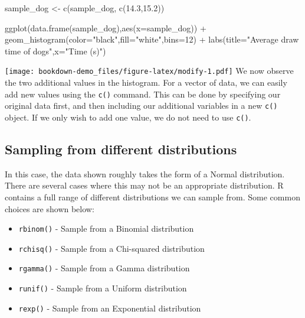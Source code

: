 \documentclass[
]{book}
\newenvironment{Shaded}{\begin{snugshade}}{\end{snugshade}}
\newcommand{\AttributeTok}[1]{\textcolor[rgb]{0.77,0.63,0.00}{#1}}
\newcommand{\DecValTok}[1]{\textcolor[rgb]{0.00,0.00,0.81}{#1}}
\newcommand{\FloatTok}[1]{\textcolor[rgb]{0.00,0.00,0.81}{#1}}
\newcommand{\FunctionTok}[1]{\textcolor[rgb]{0.00,0.00,0.00}{#1}}
\newcommand{\NormalTok}[1]{#1}
\newcommand{\OtherTok}[1]{\textcolor[rgb]{0.56,0.35,0.01}{#1}}
\newcommand{\SpecialCharTok}[1]{\textcolor[rgb]{0.00,0.00,0.00}{#1}}
\newcommand{\StringTok}[1]{\textcolor[rgb]{0.31,0.60,0.02}{#1}}
\providecommand{\tightlist}{%
  \setlength{\itemsep}{0pt}\setlength{\parskip}{0pt}}
\begin{document}
\begin{Shaded}
\begin{Highlighting}[]
\NormalTok{sample\_dog }\OtherTok{\textless{}{-}} \FunctionTok{c}\NormalTok{(sample\_dog, }\FunctionTok{c}\NormalTok{(}\FloatTok{14.3}\NormalTok{,}\FloatTok{15.2}\NormalTok{))}

\FunctionTok{ggplot}\NormalTok{(}\FunctionTok{data.frame}\NormalTok{(sample\_dog),}\FunctionTok{aes}\NormalTok{(}\AttributeTok{x=}\NormalTok{sample\_dog)) }\SpecialCharTok{+}
  \FunctionTok{geom\_histogram}\NormalTok{(}\AttributeTok{color=}\StringTok{"black"}\NormalTok{,}\AttributeTok{fill=}\StringTok{"white"}\NormalTok{,}\AttributeTok{bins=}\DecValTok{12}\NormalTok{) }\SpecialCharTok{+} 
            \FunctionTok{labs}\NormalTok{(}\AttributeTok{title=}\StringTok{"Average draw time of dogs"}\NormalTok{,}\AttributeTok{x=}\StringTok{"Time (s)"}\NormalTok{)}
\end{Highlighting}
\end{Shaded}

\texttt{[image: bookdown-demo\_files/figure-latex/modify-1.pdf]}
We now observe the two additional values in the histogram. For a vector of data, we can easily add new values using the \texttt{c()} command. This can be done by specifying our original data first, and then including our additional variables in a new \texttt{c()} object. If we only wish to add one value, we do not need to use \texttt{c()}.

\hypertarget{sampling-from-different-distributions}{%
\subsection{Sampling from different distributions}\label{sampling-from-different-distributions}}

In this case, the data shown roughly takes the form of a Normal distribution. There are several cases where this may not be an appropriate distribution. R contains a full range of different distributions we can sample from. Some common choices are shown below:

\begin{itemize}
\tightlist
\item
  \texttt{rbinom()} - Sample from a Binomial distribution
\item
  \texttt{rchisq()} - Sample from a Chi-squared distribution
\item
  \texttt{rgamma()} - Sample from a Gamma distribution
\item
  \texttt{runif()} - Sample from a Uniform distribution
\item
  \texttt{rexp()} - Sample from an Exponential distribution
\end{itemize}
\end{document}
